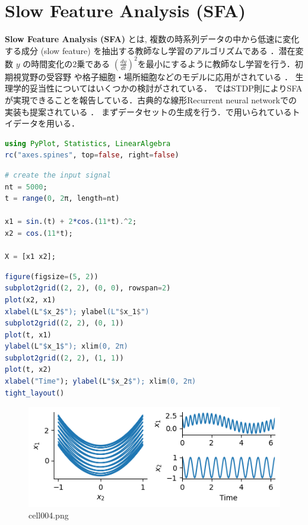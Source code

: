 \section{Slow Feature Analysis (SFA)}
\textbf{Slow Feature Analysis (SFA)} とは, 複数の時系列データの中から低速に変化する成分 (slow feature) を抽出する教師なし学習のアルゴリズムである \citep{Wiskott2002-vb,Wiskott2011-uz}．潜在変数 $y$ の時間変化の2乗である $\left(\frac{dy}{dt}\right)^2$を最小にするように教師なし学習を行う．初期視覚野の受容野 \citep{Berkes2005-i} や格子細胞・場所細胞などのモデルに応用がされている \citep{Franzius2007-sf}．
生理学的妥当性についてはいくつかの検討がされている．\citep{Sprekeler2007-qm} ではSTDP則によりSFAが実現できることを報告している．古典的な線形Recurrent neural networkでの実装も提案されている \citep{Lipshutz2020-uj}．
まずデータセットの生成を行う．\citep{Wiskott2002-vb}で用いられているトイデータを用いる．
\begin{lstlisting}[language=julia]
using PyPlot, Statistics, LinearAlgebra
rc("axes.spines", top=false, right=false)
\end{lstlisting}
\begin{lstlisting}[language=julia]
# create the input signal
nt = 5000;
t = range(0, 2π, length=nt)

x1 = sin.(t) + 2*cos.(11*t).^2;
x2 = cos.(11*t);

X = [x1 x2];
\end{lstlisting}
\begin{lstlisting}[language=julia]
figure(figsize=(5, 2))
subplot2grid((2, 2), (0, 0), rowspan=2)
plot(x2, x1)
xlabel(L"$x_2$"); ylabel(L"$x_1$")
subplot2grid((2, 2), (0, 1))
plot(t, x1)
ylabel(L"$x_1$"); xlim(0, 2π)
subplot2grid((2, 2), (1, 1))
plot(t, x2)
xlabel("Time"); ylabel(L"$x_2$"); xlim(0, 2π)
tight_layout()
\end{lstlisting}
\begin{figure}[ht]
	\centering
	\includegraphics[scale=0.8, max width=\linewidth]{./fig/local-learning-rule/slow-feature-analysis/cell004.png}
	\caption{cell004.png}
	\label{cell004.png}
\end{figure}
